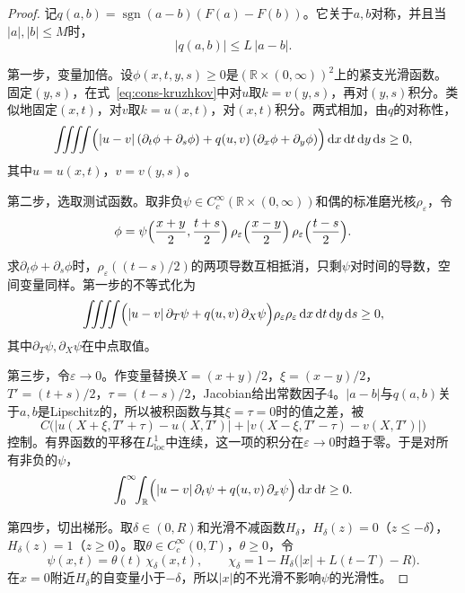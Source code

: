 \begin{proof}
记$q(a,b)=\operatorname{sgn}(a-b)(F(a)-F(b))$。它关于$a,b$对称，并且当$\lvert a\rvert,\lvert b\rvert\leq M$时，
\[
  \lvert q(a,b)\rvert\leq L\,\lvert a-b\rvert .
\]

第一步，变量加倍。设$\phi(x,t,y,s)\geq0$是$(\mathbb{R}\times(0,\infty))^2$上的紧支光滑函数。固定$(y,s)$，在式~\eqref{eq:cons-kruzhkov}中对$u$取$k=v(y,s)$，再对$(y,s)$积分。类似地固定$(x,t)$，对$v$取$k=u(x,t)$，对$(x,t)$积分。两式相加，由$q$的对称性，
\[
  \iiiint\Bigl(\lvert u-v\rvert\,(\partial_t\phi+\partial_s\phi)
  +q(u,v)\,(\partial_x\phi+\partial_y\phi)\Bigr)\,\mathrm{d}x\,\mathrm{d}t\,\mathrm{d}y\,\mathrm{d}s\geq0 ,
\]
其中$u=u(x,t)$，$v=v(y,s)$。

第二步，选取测试函数。取非负$\psi\in C_c^{\infty}(\mathbb{R}\times(0,\infty))$和偶的标准磨光核$\rho_\varepsilon$，令
\[
  \phi=\psi\Bigl(\frac{x+y}{2},\frac{t+s}{2}\Bigr)\,
  \rho_\varepsilon\Bigl(\frac{x-y}{2}\Bigr)\,\rho_\varepsilon\Bigl(\frac{t-s}{2}\Bigr).
\]

求$\partial_t\phi+\partial_s\phi$时，$\rho_\varepsilon((t-s)/2)$的两项导数互相抵消，只剩$\psi$对时间的导数，空间变量同样。第一步的不等式化为
\[
  \iiiint\Bigl(\lvert u-v\rvert\,\partial_T\psi+q(u,v)\,\partial_X\psi\Bigr)\rho_\varepsilon\rho_\varepsilon\,\mathrm{d}x\,\mathrm{d}t\,\mathrm{d}y\,\mathrm{d}s\geq0 ,
\]
其中$\partial_T\psi,\partial_X\psi$在中点取值。

第三步，令$\varepsilon\to0$。作变量替换$X=(x+y)/2$，$\xi=(x-y)/2$，$T'=(t+s)/2$，$\tau=(t-s)/2$，Jacobian给出常数因子$4$。$\lvert a-b\rvert$与$q(a,b)$关于$a,b$是Lipschitz的，所以被积函数与其$\xi=\tau=0$时的值之差，被
\[
  C\bigl(\lvert u(X+\xi,T'+\tau)-u(X,T')\rvert+\lvert v(X-\xi,T'-\tau)-v(X,T')\rvert\bigr)
\]
控制。有界函数的平移在$L^1_{\mathrm{loc}}$中连续，这一项的积分在$\varepsilon\to0$时趋于零。于是对所有非负的$\psi$，
\begin{equation}
  \int_0^{\infty}\!\!\int_{\mathbb{R}}\Bigl(\lvert u-v\rvert\,\partial_t\psi+q(u,v)\,\partial_x\psi\Bigr)\,\mathrm{d}x\,\mathrm{d}t\geq0 .
  \label{eq:cons-kato}
\end{equation}

第四步，切出梯形。取$\delta\in(0,R)$和光滑不减函数$H_\delta$，$H_\delta(z)=0$（$z\leq-\delta$），$H_\delta(z)=1$（$z\geq0$）。取$\theta\in C_c^{\infty}(0,T)$，$\theta\geq0$，令
\[
  \psi(x,t)=\theta(t)\,\chi_\delta(x,t),\qquad
  \chi_\delta=1-H_\delta\bigl(\lvert x\rvert+L(t-T)-R\bigr).
\]
在$x=0$附近$H_\delta$的自变量小于$-\delta$，所以$\lvert x\rvert$的不光滑不影响$\psi$的光滑性。


\end{proof}
